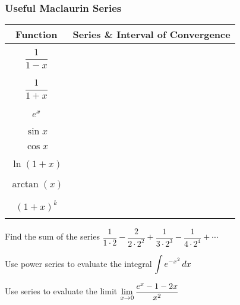 \documentclass[notes]{subfiles}
\begin{document}
	\subsubsection*{Useful Maclaurin Series}
		\begin{center}
			\begin{tabular}{c|p{4in}}
				\textbf{Function} & \textbf{Series \& Interval of Convergence}\\ \hline
				& \\
				$\dfrac{1}{1-x}$ & \\ 
				& \\
				& \\
				$\dfrac{1}{1+x}$ & \\
				& \\ 
				& \\
				$e^x$ & \\
				& \\
				& \\
				$\sin x$ & \\
				& \\
				& \\
				$\cos x$ & \\
				& \\
				& \\
				$\ln (1+x)$ & \\
				& \\
				& \\
				$\arctan (x)$ & \\
				& \\
				& \\
				$(1+x)^k$ & \\ 
				& \\
			\end{tabular}
		\end{center}
		\begin{ex}
			Find the sum of the series $\dfrac{1}{1\cdot 2} - \dfrac{2}{2\cdot 2^2} + \dfrac{1}{3\cdot 2^3} - \dfrac{1}{4\cdot 2^4} + \cdots$
		\end{ex}
			\newpage
			
		\begin{ex}
			Use power series to evaluate the integral $\displaystyle \int e^{-x^2}\, dx$
		\end{ex}
			
		\begin{ex}
			Use series to evaluate the limit $\displaystyle \lim_{x\to 0} \dfrac{e^x - 1 - 2x}{x^2}$
		\end{ex}
			
\end{document}
